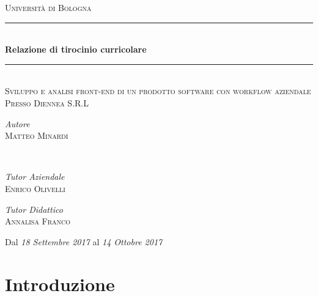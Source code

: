 \documentclass[a4paper]{article}
\begin{document}
\begin{titlepage}
	\newcommand{\HRule}{\rule{\linewidth}{0.1 mm}}
	\center
	\textsc{\LARGE Università di Bologna}\\[1.5cm] %
	
	\HRule\\[0.8 cm]
	{\huge\bfseries Relazione di tirocinio curricolare}\\[0.4cm] %
  \HRule\\[1.5cm]
  
	\textsc{\Large Sviluppo e analisi front-end di un prodotto software con workflow
	aziendale}\\[0.3cm] %
	\textsc{\large Presso Diennea S.R.L}\\[1.5cm] %
	
	
	\begin{minipage}{0.4\textwidth}
		\begin{flushleft}
			\large
			\textit{Autore}\\
			\textsc{Matteo Minardi}
		\end{flushleft}
	\end{minipage}
	~
	\begin{minipage}{0.4\textwidth}
		\begin{flushright}
			\large
			\textit{Tutor Aziendale}\\
			\textsc{Enrico Olivelli} %
    \end{flushright}
    \begin{flushright}
			\large
			\textit{Tutor Didattico}\\
			\textsc{Annalisa Franco} %
		\end{flushright}
	\end{minipage}
	

	\vfill\vfill\vfill %
  
  {\large Dal \emph{18 Settembre 2017} al \emph{14 Ottobre 2017}}\\[1 cm] %
\end{titlepage}

\section{Introduzione}
\label{sec:Introduzione}
\end{document}
